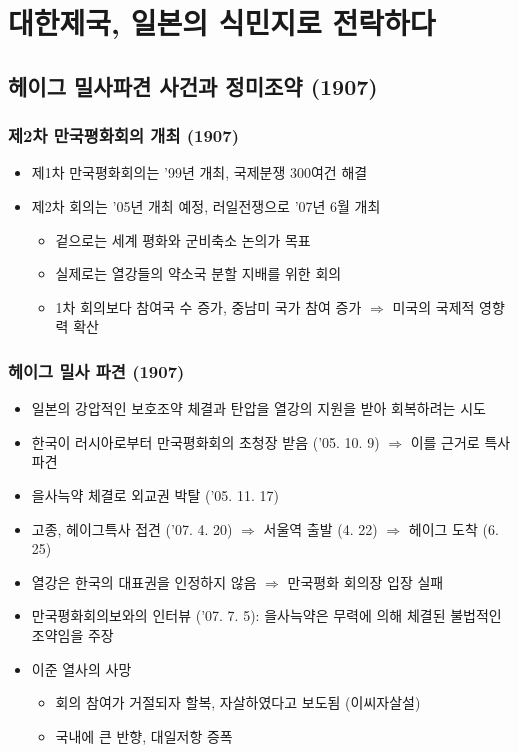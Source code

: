 \section{대한제국, 일본의 식민지로 전락하다}

\subsection{헤이그 밀사파견 사건과 정미조약 (1907)}

\subsubsection*{제2차 만국평화회의 개최 (1907)}

\begin{itemize}
    \item 제1차 만국평화회의는 '99년 개최, 국제분쟁 300여건 해결
    \item 제2차 회의는 '05년 개최 예정, 러일전쟁으로 '07년 6월 개최
    \begin{itemize}
        \item 겉으로는 세계 평화와 군비축소 논의가 목표
        \item 실제로는 열강들의 약소국 분할 지배를 위한 회의
        \item 1차 회의보다 참여국 수 증가, 중남미 국가 참여 증가 $\Rightarrow$ 미국의 국제적 영향력 확산
    \end{itemize}
\end{itemize}

\subsubsection*{헤이그 밀사 파견 (1907)}

\begin{itemize}
    \item 일본의 강압적인 보호조약 체결과 탄압을 열강의 지원을 받아 회복하려는 시도
    \item 한국이 러시아로부터 만국평화회의 초청장 받음 ('05. 10. 9) $\Rightarrow$ 이를 근거로 특사 파견
    \item 을사늑약 체결로 외교권 박탈 ('05. 11. 17)
    \item 고종, 헤이그특사 접견 ('07. 4. 20) $\Rightarrow$ 서울역 출발 (4. 22) $\Rightarrow$ 헤이그 도착 (6. 25)
    \item 열강은 한국의 대표권을 인정하지 않음 $\Rightarrow$ 만국평화 회의장 입장 실패
    \item 만국평화회의보와의 인터뷰 ('07. 7. 5): 을사늑약은 무력에 의해 체결된 불법적인 조약임을 주장
    \item 이준 열사의 사망
    \begin{itemize}
        \item 회의 참여가 거절되자 할복, 자살하였다고 보도됨 (이씨자살설)
        \item 국내에 큰 반향, 대일저항 증폭
    \end{itemize}
\end{itemize}

